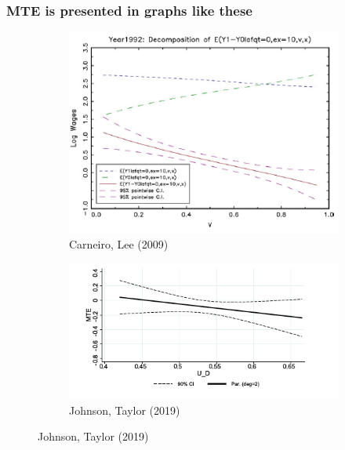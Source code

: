 \documentclass[aspectratio=169]{beamer}
\begin{document}
\begin{frame}
\frametitle{MTE is presented in graphs like these}
\centering
\begin{figure}[H]
\begin{subfigure}{0.48\textwidth}
\includegraphics[width=\textwidth]{fig11_1}
\caption{Carneiro, Lee (2009)}
\end{subfigure}
\begin{subfigure}{0.48\textwidth}
\includegraphics[width=\textwidth]{fig11_2}
\caption{Johnson, Taylor (2019)}
\end{subfigure}
\end{figure}
\end{frame}
\end{document}
